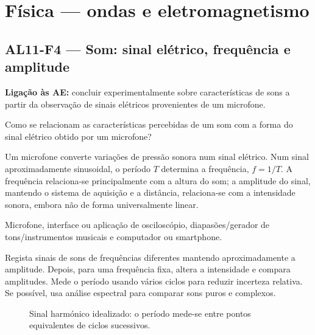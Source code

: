 \documentclass[11pt,a4paper,openany]{book}
\newcommand{\LigAE}[1]{\textbf{Ligação às AE:} #1}
\begin{document}
\chapter{Física — ondas e eletromagnetismo}

\section{AL11-F4 — Som: sinal elétrico, frequência e amplitude}
\LigAE{concluir experimentalmente sobre características de sons a partir da observação de sinais elétricos provenientes de um microfone.}

\begin{questao}
Como se relacionam as características percebidas de um som com a forma do sinal elétrico obtido por um microfone?
\end{questao}

\begin{fundamento}
Um microfone converte variações de pressão sonora num sinal elétrico. Num sinal aproximadamente sinusoidal, o período $T$ determina a frequência, $f=1/T$. A frequência relaciona-se principalmente com a altura do som; a amplitude do sinal, mantendo o sistema de aquisição e a distância, relaciona-se com a intensidade sonora, embora não de forma universalmente linear.
\end{fundamento}

\begin{material}
Microfone, interface ou aplicação de osciloscópio, diapasões/gerador de tons/instrumentos musicais e computador ou smartphone.
\end{material}

\begin{metodo}
Regista sinais de sons de frequências diferentes mantendo aproximadamente a amplitude. Depois, para uma frequência fixa, altera a intensidade e compara amplitudes. Mede o período usando vários ciclos para reduzir incerteza relativa. Se possível, usa análise espectral para comparar sons puros e complexos.
\end{metodo}

\begin{figure}[H]
\centering
{}
\caption{Sinal harmónico idealizado: o período mede-se entre pontos equivalentes de ciclos sucessivos.}
\end{figure}
\end{document}
